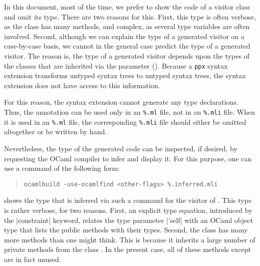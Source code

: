 \documentclass[11pt,a4paper,twoside]{article}
\begin{document}
In this document, most of the time, we prefer to show the code of a visitor
class and omit its type. There are two reasons for this. First, this type is
often verbose, as the class has many methods, and complex, as several type
variables are often involved. Second, although we can explain the type of a
generated visitor on a case-by-case basis, we cannot in the general case
predict the type of a generated visitor.
The reason is, the type of a generated visitor depends upon the
types of the classes that are inherited via the \ancestors parameter
(). Because a \texttt{ppx} syntax extension transforms
untyped syntax trees to untyped syntax trees, the \visitors syntax extension
does not have access to this information.

For this reason, the \visitors syntax extension cannot generate any type
declarations. Thus, the annotation \derivingvisitors can be used only in an
\texttt{\%.ml} file, not in an \texttt{\%.mli} file. When it is used in an
\texttt{\%.ml} file, the corresponding \texttt{\%.mli} file should either be
omitted altogether or be written by hand.



Nevertheless, the type of the generated code can be inspected, if desired, by
requesting the OCaml compiler to infer and display it. For this purpose, one
can use a command of the following form:
\begin{quote}
\verb|ocamlbuild -use-ocamlfind <other-flags> %.inferred.mli|
\end{quote}

 shows the type that is inferred via such a command for the
\iter visitor of . This type is rather verbose, for two
reasons. First, an explicit type equation, introduced by the \oc|constraint|
keyword, relates the type parameter \oc|'self| with an OCaml object type that
lists the public methods with their types. Second, the class \iter has many more
methods than one might think. This is because it inherits a large number of
private methods from the class . In the present case, all of
these methods except  are in fact unused.
\end{document}
